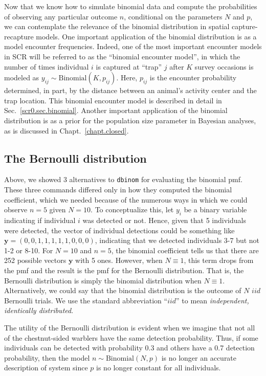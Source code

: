 Now that we know how to simulate binomial data and compute the
probabilities of observing any particular outcome $n$, conditional on the
parameters $N$ and $p$, we can contemplate the relevance of the
binomial distribution in spatial capture-recapture models. One
important application of the binomial distribution is as a model encounter
frequencies. Indeed, one of the most important encounter models in SCR
will be referred to as the ``binomial encounter model'', in which
the number of times individual $i$ is captured at ``trap'' $j$ after
$K$ survey occasions is
modeled as $y_{ij} \sim \text{Binomial}(K, p_{ij})$. Here, $p_{ij}$ is the
encounter probability determined, in part, by the distance between an
animal's activity center and the trap location.
This binomial encounter model is
described in detail in Sec.~\ref{scr0.sec.binomial}.
Another important application of the binomial distribution is as a
prior for the population size parameter in Bayesian analyses, as is
discussed in Chapt.~\ref{chapt.closed}.




\subsection{The Bernoulli distribution}

Above, we showed 3 alternatives to \verb+dbinom+ for evaluating the
binomial pmf. These three commands differed only in how they computed
the binomial coefficient, which we needed because of the numerous ways
in which we could observe $n=5$ given $N=10$. To conceptualize
this, let $y_i$ be a binary variable indicating if individual $i$
was detected or not. Hence, given that 5 individuals were detected,
the vector of individual detections could be something like
$\mathbf{y}=(0,0,1,1,1,1,1,0,0,0)$, indicating
that we detected individuals 3-7 but not 1-2 or 8-10. For $N=10$ and
$n=5$, the binomial coefficient tells us that there
are 252 possible vectors $\mathbf{y}$ with 5 ones. However, when $N \equiv 1$, this term
drops from the pmf and the result is the pmf for the Bernoulli
distribution. That is, the Bernoulli distribution is simply the
binomial distribution when $N \equiv 1$. Alternatively, we could say that the binomial
distribution is the outcome of $N$ $iid$ Bernoulli trials. We use the
standard abbreviation ``$iid$'' to mean {\it independent, identically distributed}.


The utility of the Bernoulli distribution is evident when we imagine
that not all of the chestnut-sided warblers have the same detection
probability. Thus, if some individuals can be detected with
probability 0.3 and others have a 0.7 detection probability, then the
model $n \sim \text{Binomial}(N, p)$ is no longer an accurate
description of system since $p$ is no
longer constant for all individuals.


